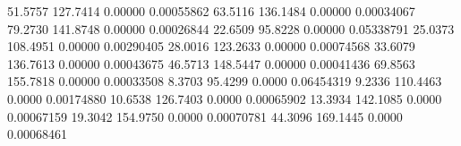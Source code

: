      51.5757     127.7414       0.00000           0.00055862
     63.5116     136.1484       0.00000           0.00034067
     79.2730     141.8748       0.00000           0.00026844
     22.6509      95.8228       0.00000           0.05338791
     25.0373     108.4951       0.00000           0.00290405
     28.0016     123.2633       0.00000           0.00074568
     33.6079     136.7613       0.00000           0.00043675
     46.5713     148.5447       0.00000           0.00041436
     69.8563     155.7818       0.00000           0.00033508
      8.3703      95.4299       0.0000           0.06454319
      9.2336     110.4463       0.0000           0.00174880
     10.6538     126.7403       0.0000           0.00065902
     13.3934     142.1085       0.0000           0.00067159
     19.3042     154.9750       0.0000           0.00070781
     44.3096     169.1445       0.0000           0.00068461